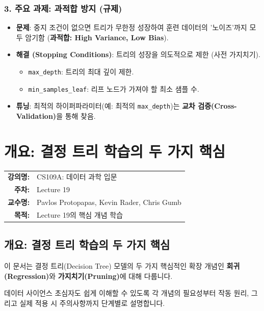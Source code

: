 \documentclass[11pt,a4paper]{book}
\makeatletter
\theoremstyle{definition}
\newcommand{\metainfo}[4]{
\begin{tcolorbox}[
    colback=lightpurple,
    colframe=darkpurple,
    boxrule=1pt,
    arc=2mm,
    left=10pt,
    right=10pt,
    top=8pt,
    bottom=8pt
]
\begin{tabular}{@{}rl@{}}
\textbf{강의명:} & #1 \\[0.3em]
\textbf{주차:} & #2 \\[0.3em]
\textbf{교수명:} & #3 \\[0.3em]
\textbf{목적:} & \begin{minipage}[t]{0.75\textwidth}#4\end{minipage}
\end{tabular}
\end{tcolorbox}
}
\makeatother
\begin{document}
\begin{tcolorbox}[title={결정 트리(Decision Tree) 한눈에 보기}]
    \subsection*{3. 주요 과제: 과적합 방지 (규제)}
    \begin{itemize}
        \item \textbf{문제}: 중지 조건이 없으면 트리가 무한정 성장하여 훈련 데이터의 '노이즈'까지 모두 암기함 (\textbf{과적합: High Variance, Low Bias}).
        \item \textbf{해결 (Stopping Conditions)}: 트리의 성장을 의도적으로 제한 (사전 가지치기).
            \begin{itemize}
                \item \texttt{max\_depth}: 트리의 최대 깊이 제한.
                \item \texttt{min\_samples\_leaf}: 리프 노드가 가져야 할 최소 샘플 수.
            \end{itemize}
        \item \textbf{튜닝}: 최적의 하이퍼파라미터(예: 최적의 \texttt{max\_depth})는 \textbf{교차 검증(Cross-Validation)}을 통해 찾음.
    \end{itemize}
\end{tcolorbox}


\chapter{개요: 결정 트리 학습의 두 가지 핵심}
\label{ch:lecture19}



\metainfo{CS109A: 데이터 과학 입문}{Lecture 19}{Pavlos Protopapas, Kevin Rader, Chris Gumb}{Lecture 19의 핵심 개념 학습}




\section*{개요: 결정 트리 학습의 두 가지 핵심}

이 문서는 결정 트리(Decision Tree) 모델의 두 가지 핵심적인 확장 개념인 \textbf{회귀(Regression)}와 \textbf{가지치기(Pruning)}에 대해 다룹니다.

데이터 사이언스 초심자도 쉽게 이해할 수 있도록 각 개념의 필요성부터 작동 원리, 그리고 실제 적용 시 주의사항까지 단계별로 설명합니다.
\end{document}
